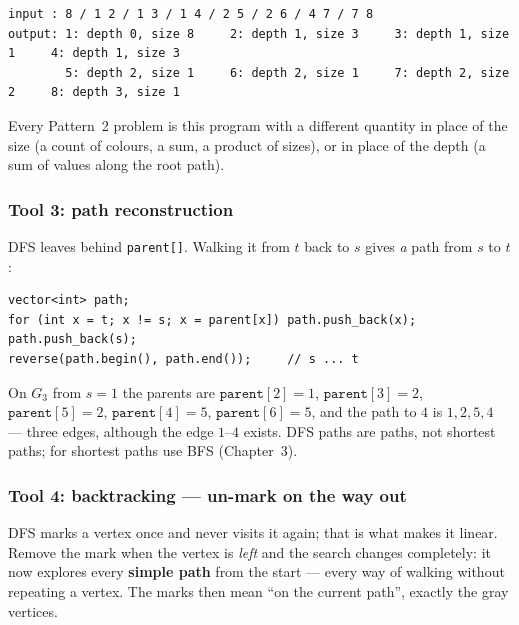 \begin{lstlisting}[style=trace]
input : 8 / 1 2 / 1 3 / 1 4 / 2 5 / 2 6 / 4 7 / 7 8
output: 1: depth 0, size 8     2: depth 1, size 3     3: depth 1, size 1     4: depth 1, size 3
        5: depth 2, size 1     6: depth 2, size 1     7: depth 2, size 2     8: depth 3, size 1
\end{lstlisting}

Every Pattern~2 problem is this program with a different quantity in place of the size (a count of colours, a sum, a product of sizes), or in place of the depth (a sum of values along the root path).

\subsubsection*{Tool 3: path reconstruction}

DFS leaves behind \texttt{parent[]}. Walking it from $t$ back to $s$ gives \emph{a} path from $s$ to $t$:
\begin{lstlisting}[style=snippet]
vector<int> path;
for (int x = t; x != s; x = parent[x]) path.push_back(x);
path.push_back(s);
reverse(path.begin(), path.end());     // s ... t
\end{lstlisting}
On $G_3$ from $s = 1$ the parents are $\texttt{parent}[2] = 1$, $\texttt{parent}[3] = 2$, $\texttt{parent}[5] = 2$, $\texttt{parent}[4] = 5$, $\texttt{parent}[6] = 5$, and the path to $4$ is $1, 2, 5, 4$ --- three edges, although the edge $1$--$4$ exists. DFS paths are paths, not shortest paths; for shortest paths use BFS (Chapter~3).

\subsubsection*{Tool 4: backtracking --- un-mark on the way out}

DFS marks a vertex once and never visits it again; that is what makes it linear. Remove the mark when the vertex is \emph{left} and the search changes completely: it now explores every \textbf{simple path} from the start --- every way of walking without repeating a vertex. The marks then mean ``on the current path'', exactly the gray vertices.

